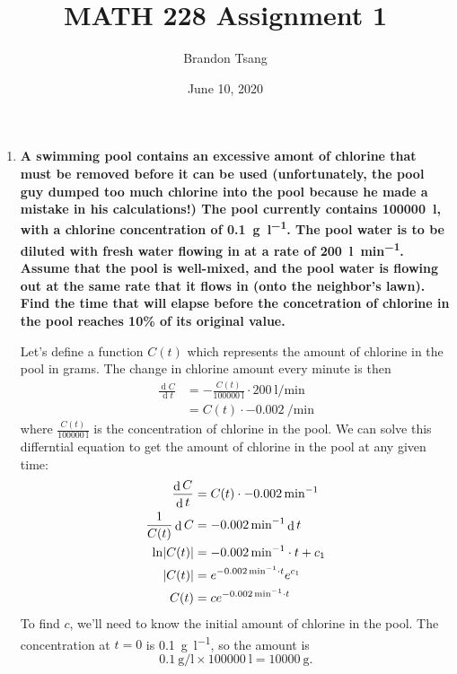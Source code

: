 \documentclass[11pt]{article}
\title{MATH 228 Assignment 1}
\author{Brandon Tsang}
\date{June 10, 2020}
\DeclareMathOperator{\diff}{d}
\newcommand\dd[2]{\frac{\diff #1}{\diff #2}}
\DeclarePairedDelimiter\abs{\lvert}{\rvert}
\begin{document}
    \maketitle
    \begin{enumerate}[label=\textbf{\arabic*.}, start=2]
        \item{
            \textbf{\boldmath A swimming pool contains an excessive amont of chlorine that must be removed before it can be used (unfortunately, the pool guy dumped too much chlorine into the pool because he made a mistake in his calculations!) The pool currently contains \SI{100000}{\litre}, with a chlorine concentration of \SI{0.1}{\gram\per\litre}. The pool water is to be diluted with fresh water flowing in at a rate of \SI{200}{\litre\per\minute}. Assume that the pool is well-mixed, and the pool water is flowing out at the same rate that it flows in (onto the neighbor's lawn). Find the time that will elapse before the concetration of chlorine in the pool reaches 10\% of its original value.}
            \par
            Let's define a function \(C(t)\) which represents the amount of chlorine in the pool in grams. The change in chlorine amount every minute is then
            \begin{align*}
                \dd{C}{t}&=-\frac{C(t)}{\SI{100000}{\litre}}\cdot\SI{200}{\litre\per\minute} \\
                &=C(t)\cdot\SI{-0.002}{\per\minute}
            \end{align*}
            where \(\frac{C(t)}{\SI{100000}{\litre}}\) is the concentration of chlorine in the pool. We can solve this differntial equation to get the amount of chlorine in the pool at any given time:
            \begin{align*}
                \dd{C}{t}&=C(t)\cdot\SI{-0.002}{\per\minute} \\
                \frac{1}{C(t)}\diff C&=\SI{-0.002}{\per\minute}\diff t \\
                \ln\abs{C(t)}&=\SI{-0.002}{\per\minute}\cdot t+c_1 \\
                \abs{C(t)}&=e^{\SI{-0.002}{\per\minute}\cdot t}e^{c_1} \\
                C(t)&=ce^{\SI{-0.002}{\per\minute}\cdot t}
            \end{align*}
            To find \(c\), we'll need to know the initial amount of chlorine in the pool. The concentration at \(t=0\) is \SI{0.1}{\gram\per\litre}, so the amount is
            \[\SI{0.1}{\gram\per\litre}\times\SI{100000}{\litre}=\SI{10000}{\gram}.\]
}
\end{enumerate}
\end{document}
